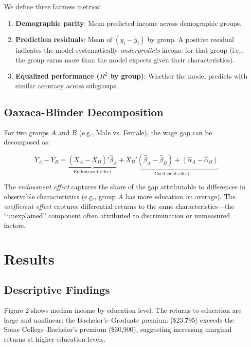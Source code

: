 \documentclass[11pt]{article}
\begin{document}
We define three fairness metrics:

\begin{enumerate}
    \item \textbf{Demographic parity}: Mean predicted income across
    demographic groups.
    \item \textbf{Prediction residuals}: Mean of $(y_i - \hat{y}_i)$ by
    group. A positive residual indicates the model systematically
    \textit{underpredicts} income for that group (i.e., the group earns
    more than the model expects given their characteristics).
    \item \textbf{Equalized performance ($R^2$ by group)}: Whether the
    model predicts with similar accuracy across subgroups.
\end{enumerate}

\subsection{Oaxaca-Blinder Decomposition}

For two groups $A$ and $B$ (e.g., Male vs. Female), the wage gap can be
decomposed as:

\begin{equation}
\bar{Y}_A - \bar{Y}_B = \underbrace{(\bar{X}_A - \bar{X}_B)'\hat{\beta}_A}_{\text{Endowment effect}} + \underbrace{\bar{X}_B'(\hat{\beta}_A - \hat{\beta}_B) + (\hat{\alpha}_A - \hat{\alpha}_B)}_{\text{Coefficient effect}}
\end{equation}

The \textit{endowment effect} captures the share of the gap attributable to
differences in observable characteristics (e.g., group $A$ has more education
on average). The \textit{coefficient effect} captures differential returns to
the same characteristics---the ``unexplained'' component often attributed to
discrimination or unmeasured factors.

\section{Results}

\subsection{Descriptive Findings}

Figure 2 shows median income by education level. The returns to education are
large and nonlinear: the Bachelor's--Graduate premium (\$23,795) exceeds the
Some College--Bachelor's premium (\$30,900), suggesting increasing marginal
returns at higher education levels.
\end{document}
